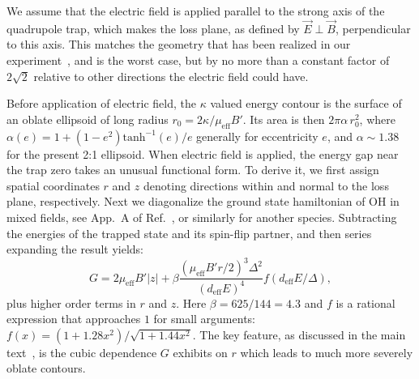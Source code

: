 \documentclass[%
 reprint,
 amsmath,amssymb,
 aps,
prl,
]{revtex4-1}
\begin{document}
We assume that the electric field is applied parallel to the strong axis of the quadrupole trap, which makes the loss plane, as defined by $\vec{E}\perp\vec{B}$, perpendicular to this axis. This matches the geometry that has been realized in our experiment~\cite{Stuhl2013}, and is the worst case, but by no more than a constant factor of $2\sqrt{2}$ relative to other directions the electric field could have.

Before application of electric field, the $\kappa$ valued energy contour is the surface of an oblate ellipsoid of long radius $r_0=2\kappa/\mu_\text{eff}B'$.
Its area is then $2\pi\alpha\,r_0^2$, where $\alpha(e)=1+(1-e^2)\text{tanh}^{-1}(e)/e$ generally for eccentricity $e$, and $\alpha\sim 1.38$ for the present 2:1 ellipsoid.
When electric field is applied, the energy gap near the trap zero takes an unusual functional form.
To derive it, we first assign spatial coordinates $r$ and $z$ denoting directions within and normal to the loss plane, respectively.
Next we diagonalize the ground state hamiltonian of OH in mixed fields, see App.~A of Ref.~\cite{Stuhl2012uwave}, or similarly for another species.
Subtracting the energies of the trapped state and its spin-flip partner, and then series expanding the result yields:
\begin{equation}
\label{eqn:energy}
G = 2\mu_\text{eff}B'|z| + \beta\frac{(\mu_\text{eff}B'r/2)^3\Delta^2}{(d_\text{eff}E)^4}f(d_\text{eff}E/\Delta),%
\end{equation}
plus higher order terms in $r$ and $z$.
Here $\beta=625/144=4.3$ and $f$ is a rational expression that approaches $1$ for small arguments: $f(x) = (1 + 1.28x^2)/\sqrt{1+1.44x^2}$. 
The key feature, as discussed in the main text~\cite{smt}, is the cubic dependence $G$ exhibits on $r$ which leads to much more severely oblate contours.
\end{document}
